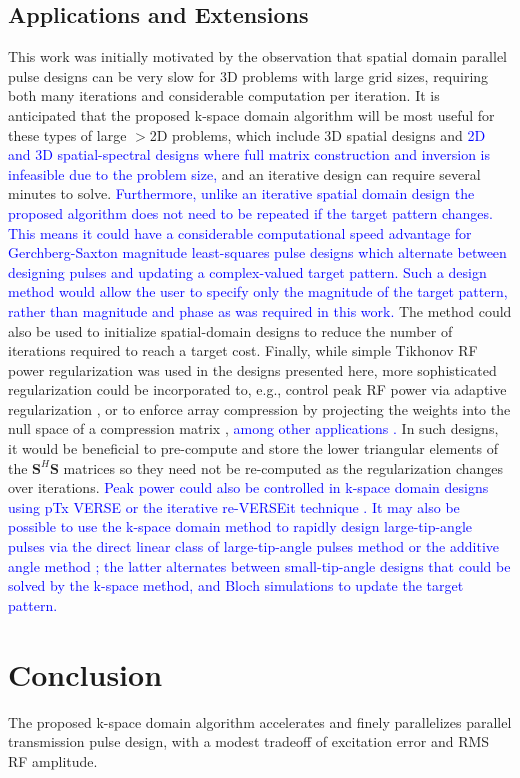 \subsection*{Applications and Extensions}
This work was initially motivated by the observation that spatial domain parallel pulse designs can be very slow
for 3D problems with large grid sizes, 
requiring both many iterations and considerable computation per iteration. 
It is anticipated that the proposed k-space domain algorithm will be most useful for these types of large $>$2D problems,
which include 3D spatial designs \cite{malik2012tailored,davids2016fast} and \textcolor{blue}{2D and 3D spatial-spectral designs \cite{stenger2000three,setsompop2009,Malik:2010aa,yang2010four}
where full matrix construction and inversion is infeasible due to the problem size, }
and an iterative design can require several minutes to solve. 
\textcolor{blue}{Furthermore, unlike an iterative spatial domain design the proposed algorithm does not need to be repeated if the target pattern changes.
This means it could have a considerable computational speed advantage for Gerchberg-Saxton magnitude least-squares pulse designs \cite{setsompop2008magnitude,malik:mrm:2015}
which alternate between designing pulses and updating a complex-valued target pattern.
Such a design method would allow the user to specify only the magnitude of the target pattern, 
rather than magnitude and phase as was required in this work.}
The method could also be used to initialize spatial-domain designs to reduce the number of iterations required to reach a target cost. 
Finally, while simple Tikhonov RF power regularization was used in the designs presented here,
more sophisticated regularization could be incorporated to, 
e.g., control peak RF power via adaptive regularization \cite{Yip:2005:Magn-Reson-Med:16155881},
or to enforce array compression by projecting the weights into the null space of a compression matrix \cite{cao2016array},
\textcolor{blue}{among other applications \cite{padormo:2016,deniz:2019}.} 
In such designs, it would be beneficial to pre-compute and store the lower triangular elements of the $\bm{S}^H\bm{S}$ matrices
so they need not be re-computed as the regularization changes over iterations.  
\textcolor{blue}{Peak power could also be controlled in k-space domain designs using pTx VERSE \cite{Lee:2011:MRM} or the iterative re-VERSEit technique \cite{lee2009tod}.} 
\textcolor{blue}{It may also be possible to use the k-space domain method to rapidly design large-tip-angle pulses via the direct linear class of large-tip-angle pulses method \cite{Xu:2008aa} or the additive angle method \cite{grissom:mrm:2008}; 
the latter alternates between small-tip-angle designs that could be solved by the k-space method, 
and Bloch simulations to update the target pattern.} 


\section*{Conclusion}
The proposed k-space domain algorithm accelerates and finely parallelizes parallel transmission pulse design,
with a modest tradeoff of excitation error and RMS RF amplitude.